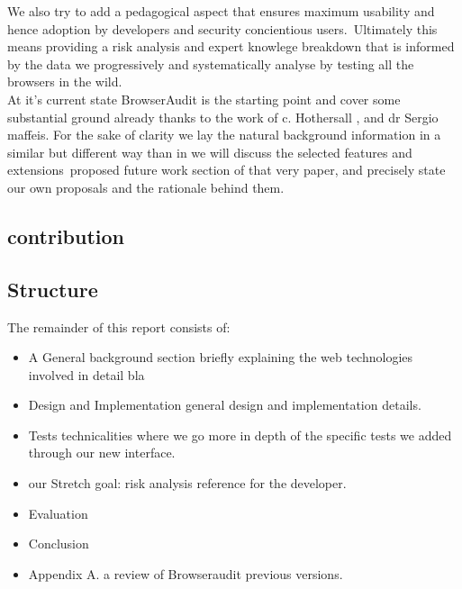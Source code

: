 \documentclass[a4paper,12pt]{report}
\begin{document}
We also try to add a pedagogical aspect that ensures maximum usability and hence adoption by developers and security concientious users.\ 
Ultimately this means providing a risk analysis and expert knowlege breakdown that is informed by the data we progressively and systematically analyse by testing all the browsers in the wild.\\

At it's current state BrowserAudit is the starting point and cover some substantial ground already thanks to the work of c. Hothersall , and dr Sergio maffeis.
For the sake of clarity we lay the natural background information in a similar but different way than in \cite{maffeis}  we will discuss the selected features and extensions\
proposed future work section of that very paper, and precisely state our own proposals and the rationale behind them.\\

\subsection{contribution}

\subsection{Structure}
The remainder of this report consists of:
\begin{itemize}
 \item A General background section briefly explaining the web technologies involved in detail bla
 \item Design and Implementation general design and implementation details.
 \item Tests technicalities where we go more in depth of the specific tests we added through our new interface.
 \item our Stretch goal: risk analysis reference for the developer.
 \item Evaluation
 \item Conclusion
 \item Appendix A. a review of Browseraudit previous versions. 
\end{itemize}











\end{document}
